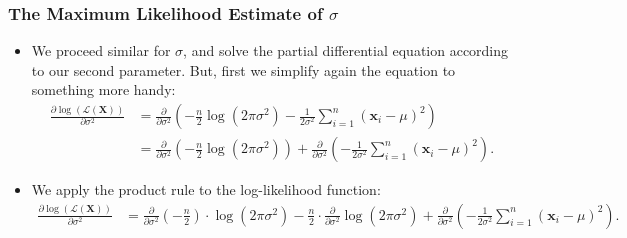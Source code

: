 \begin{frame}
	\frametitle{The Maximum Likelihood Estimate of $\sigma$}
	\begin{itemize}
		\item We proceed similar for $\sigma$, and solve the partial differential equation according to our second parameter. But, first we simplify again the equation to something more handy:
		      \begin{align}
			      \frac{\partial \log\left(\mathcal{L}(\mathbf{X})\right)}{\partial \sigma^2} & = \frac{\partial}{\partial\sigma^2} \left(-\frac{n}{2} \log\left(2\pi\sigma^2\right) - \frac{1}{2\sigma^2} \sum_{i=1}^{n} (\mathbf{x}_i-\mu)^2 \right)                                                 \\
			                                                                                  & = \frac{\partial}{\partial\sigma^2} \left(-\frac{n}{2} \log\left(2\pi\sigma^2\right)\right) + \frac{\partial}{\partial\sigma^2}\left(-\frac{1}{2\sigma^2} \sum_{i=1}^{n} (\mathbf{x}_i-\mu)^2 \right).
		      \end{align}
		\item We apply the product rule to the log-likelihood function:
		      \begin{align*}
			      \frac{\partial \log\left(\mathcal{L}(\mathbf{X})\right)}{\partial \sigma^2} & = \frac{\partial}{\partial\sigma^2}(-\frac{n}{2}) \cdot \log\left(2\pi\sigma^2\right) - \frac{n}{2} \cdot \frac{\partial}{\partial\sigma^2} \log\left(2\pi\sigma^2\right) + \frac{\partial}{\partial\sigma^2}\left( -\frac{1}{2\sigma^2} \sum_{i=1}^{n} (\mathbf{x}_i-\mu)^2 \right).
		      \end{align*}
	\end{itemize}
\end{frame}



